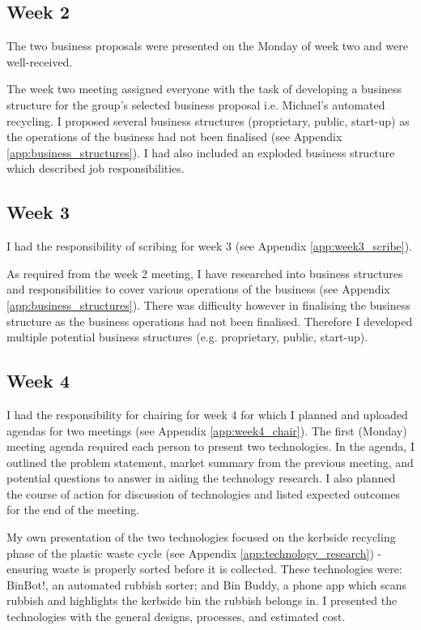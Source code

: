 \documentclass[11pt, a4, nocenter, margin=150mm]{article}
\begin{document}
	\subsection{Week 2}

	The two business proposals were presented on the Monday of week two and were well-received.

	The week two meeting assigned everyone with the task of developing a business structure for the group's selected business proposal i.e. Michael's automated recycling. I proposed several business structures (proprietary, public, start-up) as the operations of the business had not been finalised (see Appendix \ref{app:business_structures}). I had also included an exploded business structure which described job responsibilities.

	\subsection{Week 3}

	I had the responsibility of scribing for week 3 (see Appendix \ref{app:week3_scribe}).
	
	As required from the week 2 meeting, I have researched into business structures and responsibilities to cover various operations of the business (see Appendix \ref{app:business_structures}). There was difficulty however in finalising the business structure as the business operations had not been finalised. Therefore I developed multiple potential business structures (e.g. proprietary, public, start-up).

	\subsection{Week 4}

	I had the responsibility for chairing for week 4 for which I planned and uploaded agendas for two meetings (see Appendix \ref{app:week4_chair}). The first (Monday) meeting agenda required each person to present two technologies. In the agenda, I outlined the problem statement, market summary from the previous meeting, and potential questions to answer in aiding the technology research. I also planned the course of action for discussion of technologies and listed expected outcomes for the end of the meeting.

	My own presentation of the two technologies focused on the kerbside recycling phase of the plastic waste cycle (see Appendix \ref{app:technology_research}) - ensuring waste is properly sorted before it is collected. These technologies were: BinBot!, an automated rubbish sorter; and Bin Buddy, a phone app which scans rubbish and highlights the kerbside bin the rubbish belongs in. I presented the technologies with the general designs, processes, and estimated cost.
\end{document}

